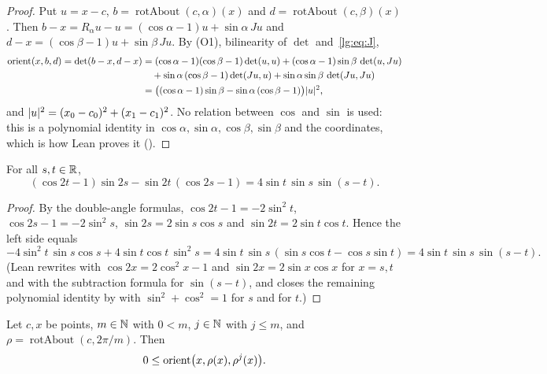 \begin{proof}
Put $u=x-c$, $b=\operatorname{rotAbout}(c,\alpha)(x)$ and $d=\operatorname{rotAbout}(c,\beta)(x)$. Then
$b-x=R_\alpha u-u=(\cos\alpha-1)u+\sin\alpha\,Ju$ and $d-x=(\cos\beta-1)u+\sin\beta\,Ju$. By (O1), bilinearity of
$\det$ and~\eqref{lg:eq:J},
\begin{align*}
  \operatorname{orient}(x,b,d)=\det(b-x,d-x)
  &=(\cos\alpha-1)(\cos\beta-1)\det(u,u)+(\cos\alpha-1)\sin\beta\,\det(u,Ju)\\
  &\quad+\sin\alpha\,(\cos\beta-1)\det(Ju,u)+\sin\alpha\sin\beta\,\det(Ju,Ju)\\
  &=\bigl((\cos\alpha-1)\sin\beta-\sin\alpha\,(\cos\beta-1)\bigr)\lvert u\rvert^2,
\end{align*}
and $\lvert u\rvert^2=(x_0-c_0)^2+(x_1-c_1)^2$. No relation between $\cos$ and $\sin$ is used: this is a polynomial identity in
$\cos\alpha,\sin\alpha,\cos\beta,\sin\beta$ and the coordinates, which is how Lean proves it ().
\end{proof}

\begin{lemma}\label{lg:lem:trig}
For all $s,t\in\mathbb R$,
\[
  (\cos 2t-1)\sin 2s-\sin 2t\,(\cos 2s-1)=4\sin t\,\sin s\,\sin(s-t).
\]
\end{lemma}

\begin{proof}
By the double-angle formulas, $\cos2t-1=-2\sin^2t$, $\cos2s-1=-2\sin^2s$, $\sin2s=2\sin s\cos s$ and
$\sin2t=2\sin t\cos t$. Hence the left side equals
\[
  -4\sin^2t\,\sin s\cos s+4\sin t\cos t\,\sin^2s=4\sin t\,\sin s\,(\sin s\cos t-\cos s\sin t)=4\sin t\,\sin s\,\sin(s-t).
\]
(Lean rewrites with $\cos2x=2\cos^2x-1$ and $\sin2x=2\sin x\cos x$ for $x=s,t$ and with the subtraction formula for
$\sin(s-t)$, and closes the remaining polynomial identity by  with $\sin^2+\cos^2=1$ for $s$
and for $t$.)
\end{proof}

\begin{lemma}\label{lg:lem:regular}
Let $c,x$ be points, $m\in\mathbb N$ with $0<m$, $j\in\mathbb N$ with $j\le m$, and $\rho=\operatorname{rotAbout}(c,2\pi/m)$. Then
\[
  0\le\operatorname{orient}\bigl(x,\rho(x),\rho^{j}(x)\bigr).
\]
\end{lemma}

